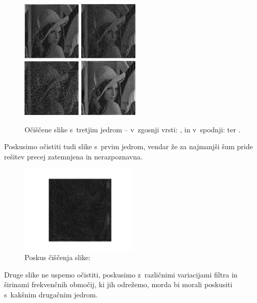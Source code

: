 \documentclass[a4paper,pdftex,10pt]{article}
\numberwithin{figure}{section} %
\begin{document}
\begin{figure}[H]
    \centering
    \includegraphics[width=0.25\textwidth]{temp/ociscena-k3-n4.pdf}
    \includegraphics[width=0.25\textwidth]{temp/ociscena-k3-n8.pdf}\\
    \includegraphics[width=0.25\textwidth]{temp/ociscena-k3-n16.pdf}
    \includegraphics[width=0.25\textwidth]{temp/ociscena-k3-nx.pdf}
    \caption{Očiščene slike s~tretjim jedrom -- v~zgosnji vrsti: \protect{}, 
    \protect{} in v~spodnji: \protect{} ter \protect{}.}
    \label{slika11}
\end{figure}
Poskusimo očistiti tudi slike s~prvim jedrom, vendar že za najmanjši šum pride rešitev
precej zatemnjena in nerazpoznavna.
\begin{figure}[H]
    \centering
    \includegraphics[width=0.5\textwidth]{temp/ociscena-k1-n4.pdf}
    \caption{Poskus čiščenja slike: \protect{}}
    \label{slika12}
\end{figure}
Druge slike ne uspemo očistiti, poskusimo z~različnimi variacijami filtra in širinami 
frekvenčnih območij, ki jih odrežemo, morda bi morali poskusiti s~kakšnim drugačnim jedrom.
\end{document}
